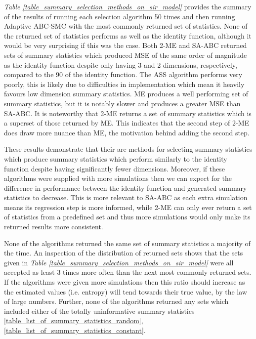 \documentclass[11pt,a4paper]{article}
\theoremstyle{break}
\begin{document}
  \par \textit{Table \ref{table_summary_selection_methods_on_sir_model}} provides the summary of the results of running each selection algorithm 50 times and then running Adaptive ABC-SMC with the most commonly returned set of statistics. None of the returned set of statistics performs as well as the identity function, although it would be very surprising if this was the case. Both 2-ME and SA-ABC returned sets of summary statistics which produced MSE of the same order of magnitude as the identity function despite only having 3 and 2 dimensions, respectively, compared to the 90 of the identity function. The ASS algorithm performs very poorly, this is likely due to difficulties in implementation which mean it heavily favours low dimension summary statistics. ME produces a well performing set of summary statistics, but it is notably slower and produces a greater MSE than SA-ABC. It is noteworthy that 2-ME returns a set of summary statistics which is a superset of those returned by ME. This indicates that the second step of 2-ME does draw more nuance than ME, the motivation behind adding the second step.

  \par These results demonstrate that their are methods for selecting summary statistics which produce summary statistics which perform similarly to the identity function despite having significantly fewer dimensions. Moreover, if these algorithms were supplied with more simulations then we can expect for the difference in performance between the identity function and generated summary statistics to decrease. This is more relevant to SA-ABC as each extra simulation means its regression step is more informed, while 2-ME can only ever return a set of statistics from a predefined set and thus more simulations would only make its returned results more consistent.

  \par None of the algorithms returned the same set of summary statistics a majority of the time. An inspection of the distribution of returned sets shows that the sets given in \textit{Table \ref{table_summary_selection_methods_on_sir_model}} were all accepted as least 3 times more often than the next most commonly returned sets. If the algorithms were given more simulations then this ratio should increase as the estimated values (i.e. entropy) will tend towards their true value, by the law of large numbers. Further, none of the algorithms returned any sets which included either of the totally uninformative summary statistics \ref{table_list_of_summary_statistics_random},\ref{table_list_of_summary_statistics_constant}.
\end{document}
